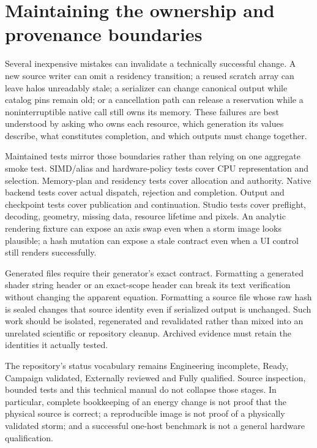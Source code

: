 \section{Maintaining the ownership and provenance boundaries}

Several inexpensive mistakes can invalidate a technically successful change.
A new source writer can omit a residency transition; a reused scratch array
can leave halos unreadably stale; a serializer can change canonical output
while catalog pins remain old; or a cancellation path can release a reservation
while a noninterruptible native call still owns its memory. These failures are
best understood by asking who owns each resource, which generation its values
describe, what constitutes completion, and which outputs must change together.

Maintained tests mirror those boundaries rather than relying on one aggregate
smoke test. SIMD/alias and hardware-policy tests cover CPU representation and
selection. Memory-plan and residency tests cover allocation and authority.
Native backend tests cover actual dispatch, rejection and completion. Output
and checkpoint tests cover publication and continuation. Studio tests cover
preflight, decoding, geometry, missing data, resource lifetime and pixels.
An analytic rendering fixture can expose an axis swap even when a storm image
looks plausible; a hash mutation can expose a stale contract even when a UI
control still renders successfully.

Generated files require their generator's exact contract. Formatting a
generated shader string header or an exact-scope header can break its text
verification without changing the apparent equation. Formatting a source file
whose raw hash is sealed changes that source identity even if serialized output
is unchanged. Such work should be isolated, regenerated and revalidated rather
than mixed into an unrelated scientific or repository cleanup. Archived
evidence must retain the identities it actually tested.

The repository's status vocabulary remains Engineering incomplete, Ready,
Campaign validated, Externally reviewed and Fully qualified. Source inspection,
bounded tests and this technical manual do not collapse those stages. In
particular, complete bookkeeping of an energy change is not proof that the
physical source is correct; a reproducible image is not proof of a physically
validated storm; and a successful one-host benchmark is not a general hardware
qualification.

